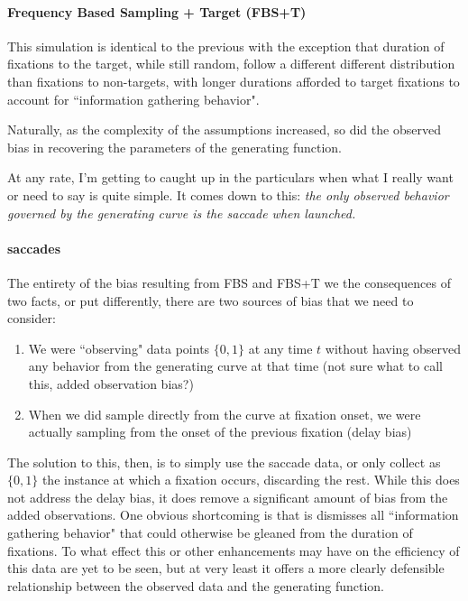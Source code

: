 \documentclass{article}
\begin{document}
\paragraph{Frequency Based Sampling + Target (FBS+T)} This simulation is identical to the previous with the exception that duration of fixations to the target, while still random, follow a different different distribution than fixations to non-targets, with longer durations afforded to target fixations to account for ``information gathering behavior". 

Naturally, as the complexity of the assumptions increased, so did the observed bias in recovering the parameters of the generating function.

At any rate, I'm getting to caught up in the particulars when what I really want or need to say is quite simple. It comes down to this: \textit{the only observed behavior governed by the generating curve is the saccade when launched.}

\paragraph{saccades}

The entirety of the bias resulting from FBS and FBS+T we the consequences of two facts, or put differently, there are two sources of bias that we need to consider:
\begin{singlespace}
\begin{enumerate}
\item We were ``observing" data points $\{0,1\}$ at any time $t$ without having observed any behavior from the generating curve at that time (not sure what to call this, added observation bias?)
\item When we did sample directly from the curve at fixation onset, we were actually sampling from the onset of the previous fixation (delay bias)
\end{enumerate}
\end{singlespace}

The solution to this, then, is to simply use the saccade data, or only collect as $\{0,1\}$ the instance at which a fixation occurs, discarding the rest. While this does not address the delay bias, it does remove a significant amount of bias from the added observations. One obvious shortcoming is that is dismisses all ``information gathering behavior" that could otherwise be gleaned from the  duration of fixations. To what effect this or other enhancements may have on the efficiency of this data are yet to be seen, but at very least it offers a more clearly defensible relationship between the observed data and the generating function.
\end{document}
